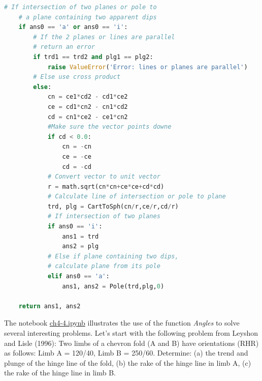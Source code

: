 \documentclass[a4paper , 12pt]{book}
\begin{document}
\begin{center}
\begin{lstlisting}[language=Python, frame=single]
    # If intersection of two planes or pole to 
    # a plane containing two apparent dips
    if ans0 == 'a' or ans0 == 'i':
        # If the 2 planes or lines are parallel 
        # return an error
        if trd1 == trd2 and plg1 == plg2:
            raise ValueError('Error: lines or planes are parallel')
        # Else use cross product
        else:
            cn = ce1*cd2 - cd1*ce2
            ce = cd1*cn2 - cn1*cd2
            cd = cn1*ce2 - ce1*cn2
            #Make sure the vector points downe
            if cd < 0.0:
                cn = -cn
                ce = -ce
                cd = -cd
            # Convert vector to unit vector
            r = math.sqrt(cn*cn+ce*ce+cd*cd)
            # Calculate line of intersection or pole to plane
            trd, plg = CartToSph(cn/r,ce/r,cd/r)
            # If intersection of two planes
            if ans0 == 'i':
                ans1 = trd
                ans2 = plg
            # Else if plane containing two dips, 
            # calculate plane from its pole
            elif ans0 == 'a':
                ans1, ans2 = Pole(trd,plg,0)
    
    return ans1, ans2
\end{lstlisting}    
\end{center}

The notebook \href{http://github.com}{ch4-4.ipynb} illustrates the use of the function \textit{Angles} to solve several interesting problems. Let's start with the following problem from Leyshon and Lisle (1996): Two limbs of a chevron fold (A and B) have orientations (RHR) as follows: Limb A = 120/40, Limb B = 250/60. Determine: (a) the trend and plunge of the hinge line of the fold, (b) the rake of the hinge line in limb A, (c) the rake of the hinge line in limb B. 
\end{document}
